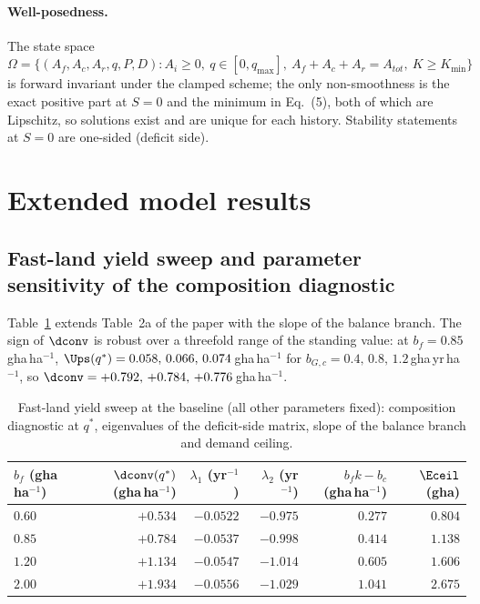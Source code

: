 \paragraph{Well-posedness.} The state space $\Omega=\{(A_f,A_c,A_r,q,P,D):A_i\ge0,\ q\in[0,q_{\max}],\ A_f+A_c+A_r=A_{tot},\ K\ge K_{\min}\}$ is forward invariant under the clamped scheme; the only non-smoothness is the exact positive part at $S=0$ and the minimum in Eq.~(5), both of which are Lipschitz, so solutions exist and are unique for each history. Stability statements at $S=0$ are one-sided (deficit side).

\section{Extended model results}\label{si:results}

\subsection{Fast-land yield sweep and parameter sensitivity of the composition diagnostic}\label{si:sweep}

Table~\ref{tab:si_sweep} extends Table~2a of the paper with the slope of the balance branch. The sign of $\dconv$ is robust over a threefold range of the standing value: at $b_f=0.85$\,gha\,ha$^{-1}$, $\Ups(q^*)=0.058,\,0.066,\,0.074$\,gha\,ha$^{-1}$ for $b_{G,c}=0.4,\,0.8,\,1.2$\,gha\,yr\,ha$^{-1}$, so $\dconv=+0.792,\,+0.784,\,+0.776$\,gha\,ha$^{-1}$.

\begin{table}[htbp]
\centering\small
\caption{Fast-land yield sweep at the baseline (all other parameters fixed): composition diagnostic at $q^*$, eigenvalues of the deficit-side matrix, slope of the balance branch and demand ceiling.}
\label{tab:si_sweep}
\begin{tabular}{l r r r r r}
\toprule
$b_f$ (gha\,ha$^{-1}$) & $\dconv(q^*)$ (gha\,ha$^{-1}$) & $\lambda_1$ (yr$^{-1}$) & $\lambda_2$ (yr$^{-1}$) & $b_fk-b_c$ (gha\,ha$^{-1}$) & $\Eceil$ (gha) \\
\midrule
$0.60$ & $+0.534$ & $-0.0522$ & $-0.975$ & $0.277$ & $0.804$ \\
$0.85$ & $+0.784$ & $-0.0537$ & $-0.998$ & $0.414$ & $1.138$ \\
$1.20$ & $+1.134$ & $-0.0547$ & $-1.014$ & $0.605$ & $1.606$ \\
$2.00$ & $+1.934$ & $-0.0556$ & $-1.029$ & $1.041$ & $2.675$ \\
\bottomrule
\end{tabular}
\end{table}

